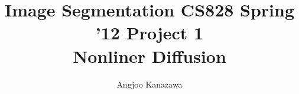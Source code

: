 \newcommand{\sig}{\sigma}
\newcommand{\eps}{\epsilon}
\newcommand{\del}{\delta}
\newcommand{\ah}{\alpha}
\newcommand{\lam}{\lambda}
\newcommand{\gam}{\gamma}
\newcommand{\kap}{\kappa}
\newcommand{\rarr}{\rightarrow}
\newcommand{\larr}{\leftarrow}
\newcommand{\lrarr}{\Leftrightarrow}
\newcommand{\ol}{\overline}
\newcommand{\mbb}{\mathbb}
\newcommand{\contra}{\Rightarrow\Leftarrow}
\newcommand{\lc}{\langle} %
\newcommand{\rc}{\rangle} %
\newcommand{\pri}{^{'}} %

\newcommand{\ben}{\begin{enumerate}}
\newcommand{\een}{\end{enumerate}}
\newcommand{\beq}{\begin{quote}}
\newcommand{\enq}{\end{quote}}
\newcommand{\hsone}{\hspace*{1cm}}
\newcommand{\hstwo}{\hspace*{2cm}}
\newcommand{\conv}{\convolution}
\newcommand{\Ix}{I_x}
\newcommand{\Iy}{I_y}
\newcommand{\Ixy}{I_{xy}}
\newcommand{\cO}{\mathcal{O}}
\renewcommand{\vec}[1]{\boldsymbol{#1}}
\newcommand{\grad}{\nabla}

\newcommand{\noi}{\noindent}
\parskip 5pt
\parindent 0pt

\documentclass[10pt,a4paper]{article}
\usepackage[letterpaper,hmargin=1.15in,vmargin=1.25in]{geometry} %
\usepackage{amsmath,amssymb,algorithmic,mathabx,hyperref,graphicx}

\title{Image Segmentation CS828 Spring '12 Project 1\\ Nonliner Diffusion}
\author{Angjoo Kanazawa}
\maketitle

\section{Results}
\label{sec:results}

